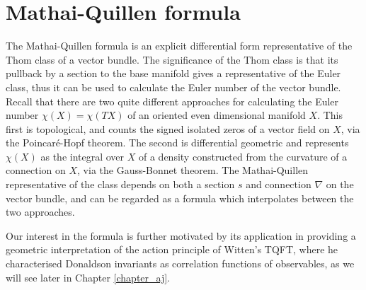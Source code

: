 
\chapter{Mathai-Quillen formula}
\label{chapter_mq}
The Mathai-Quillen formula is an explicit differential form representative of 
the Thom class of a vector bundle. The significance of the Thom class is 
that its pullback by a section to the base manifold gives a representative of the Euler
class, thus it can be used to calculate the Euler number of the vector bundle.  
Recall that there are two quite different approaches for calculating the Euler number
$\chi(X) = \chi(TX)$ of an oriented even dimensional manifold $X$. 
This first is topological, and counts
the signed isolated zeros of a vector field on $X$, via the Poincar\'e-Hopf theorem. The
second is differential geometric and represents  $\chi(X)$ as the integral over
$X$ of a density constructed from the curvature of a connection on $X$, via
the Gauss-Bonnet theorem. 
The Mathai-Quillen representative of the class depends on both a section $s$ and 
connection  $\nabla$ on the vector bundle, and can be regarded as a formula 
which interpolates between the two approaches.  

Our interest in the formula is further motivated by its application in providing a
geometric interpretation of the action principle of Witten's TQFT, where he
characterised Donaldson invariants as correlation functions of observables, as
we will see later in Chapter \ref{chapter_aj}. 

